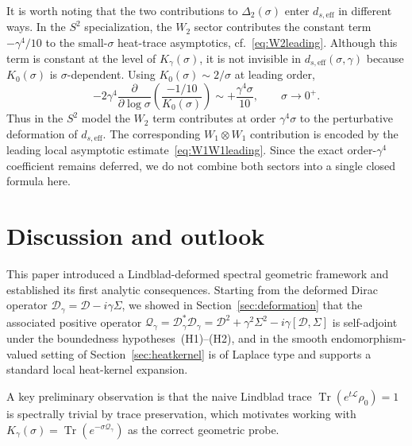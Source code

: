 \documentclass[11pt,a4paper]{article}
\numberwithin{equation}{section}
\theoremstyle{definition}
\newcommand{\cD}{\mathcal{D}}
\newcommand{\cL}{\mathcal{L}}
\newcommand{\Qg}{\mathcal{Q}_\gamma}
\newcommand{\Dg}{\mathcal{D}_\gamma}
\newcommand{\Sig}{\Sigma}
\newcommand{\Tr}{\operatorname{Tr}}
\begin{document}
It is worth noting that the two contributions to $\Delta_2(\sigma)$ enter
$d_{s,\mathrm{eff}}$ in different ways. In the $S^2$ specialization, the
$W_2$ sector contributes the constant term $-\gamma^4/10$ to the
small-$\sigma$ heat-trace asymptotics, cf.~\eqref{eq:W2leading}. Although
this term is constant at the level of $K_\gamma(\sigma)$, it is not
invisible in $d_{s,\mathrm{eff}}(\sigma,\gamma)$ because $K_0(\sigma)$ is
$\sigma$-dependent. Using $K_0(\sigma)\sim 2/\sigma$ at leading order,
\begin{equation}
-2\gamma^4 \frac{\partial}{\partial \log\sigma}
\!\left(\frac{-1/10}{K_0(\sigma)}\right)
\sim +\frac{\gamma^4\sigma}{10},
\qquad \sigma\to 0^+.
\label{eq:W2dseff}
\end{equation}
Thus in the $S^2$ model the $W_2$ term contributes at order $\gamma^4\sigma$
to the perturbative deformation of $d_{s,\mathrm{eff}}$. The corresponding
$W_1\otimes W_1$ contribution is encoded by the leading local asymptotic
estimate~\eqref{eq:W1W1leading}. Since the exact order-$\gamma^4$
coefficient remains deferred, we do not combine both sectors into a single
closed formula here.

\section{Discussion and outlook}
\label{sec:discussion}

This paper introduced a Lindblad-deformed spectral geometric framework
and established its first analytic consequences. Starting from the
deformed Dirac operator $\Dg = \cD - i\gamma\Sig$, we showed in
Section~\ref{sec:deformation} that the associated positive operator
$\Qg = \Dg^*\Dg = \cD^2 + \gamma^2\Sig^2 - i\gamma[\cD,\Sig]$ is
self-adjoint under the boundedness hypotheses~(H1)--(H2), and in the
smooth endomorphism-valued setting of Section~\ref{sec:heatkernel} is of
Laplace type and supports a standard local heat-kernel expansion.

A key preliminary observation is that the naive
Lindblad trace $\Tr(e^{t\cL}\rho_0) = 1$ is spectrally trivial by
trace preservation, which motivates working with
$K_\gamma(\sigma) = \Tr(e^{-\sigma\Qg})$ as the correct geometric probe.
\end{document}
